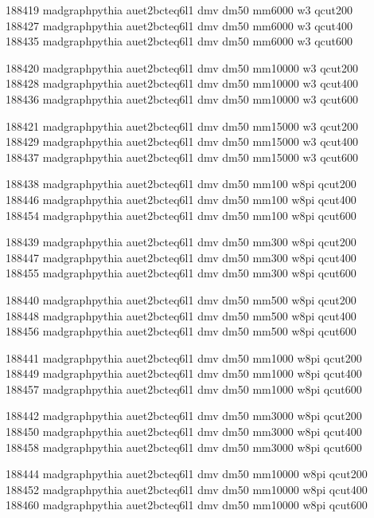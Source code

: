 188419 madgraphpythia auet2bcteq6l1 dmv dm50 mm6000 w3 qcut200\\
188427 madgraphpythia auet2bcteq6l1 dmv dm50 mm6000 w3 qcut400\\
188435 madgraphpythia auet2bcteq6l1 dmv dm50 mm6000 w3 qcut600

188420 madgraphpythia auet2bcteq6l1 dmv dm50 mm10000 w3 qcut200\\
188428 madgraphpythia auet2bcteq6l1 dmv dm50 mm10000 w3 qcut400\\
188436 madgraphpythia auet2bcteq6l1 dmv dm50 mm10000 w3 qcut600

188421 madgraphpythia auet2bcteq6l1 dmv dm50 mm15000 w3 qcut200\\
188429 madgraphpythia auet2bcteq6l1 dmv dm50 mm15000 w3 qcut400\\
188437 madgraphpythia auet2bcteq6l1 dmv dm50 mm15000 w3 qcut600

188438 madgraphpythia auet2bcteq6l1 dmv dm50 mm100 w8pi qcut200\\
188446 madgraphpythia auet2bcteq6l1 dmv dm50 mm100 w8pi qcut400\\
188454 madgraphpythia auet2bcteq6l1 dmv dm50 mm100 w8pi qcut600

188439 madgraphpythia auet2bcteq6l1 dmv dm50 mm300 w8pi qcut200\\
188447 madgraphpythia auet2bcteq6l1 dmv dm50 mm300 w8pi qcut400\\
188455 madgraphpythia auet2bcteq6l1 dmv dm50 mm300 w8pi qcut600

188440 madgraphpythia auet2bcteq6l1 dmv dm50 mm500 w8pi qcut200\\
188448 madgraphpythia auet2bcteq6l1 dmv dm50 mm500 w8pi qcut400\\
188456 madgraphpythia auet2bcteq6l1 dmv dm50 mm500 w8pi qcut600

188441 madgraphpythia auet2bcteq6l1 dmv dm50 mm1000 w8pi qcut200\\
188449 madgraphpythia auet2bcteq6l1 dmv dm50 mm1000 w8pi qcut400\\
188457 madgraphpythia auet2bcteq6l1 dmv dm50 mm1000 w8pi qcut600

188442 madgraphpythia auet2bcteq6l1 dmv dm50 mm3000 w8pi qcut200\\
188450 madgraphpythia auet2bcteq6l1 dmv dm50 mm3000 w8pi qcut400\\
188458 madgraphpythia auet2bcteq6l1 dmv dm50 mm3000 w8pi qcut600

188444 madgraphpythia auet2bcteq6l1 dmv dm50 mm10000 w8pi qcut200\\
188452 madgraphpythia auet2bcteq6l1 dmv dm50 mm10000 w8pi qcut400\\
188460 madgraphpythia auet2bcteq6l1 dmv dm50 mm10000 w8pi qcut600


